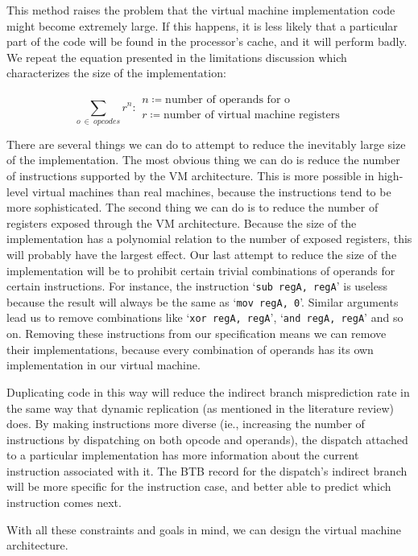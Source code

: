 	This method raises the problem that the virtual machine implementation code might become extremely large. If this happens, it is less likely that a particular part of the code will be found in the processor's cache, and it will perform badly. We repeat the equation presented in the limitations discussion which characterizes the size of the implementation:
	
	\[
	\sum_{o~\in~opcodes} r^n : 
	\begin{array}{l}
	n \coloneqq \text{number of operands for o} \\
	r \coloneqq \text{number of virtual machine registers}
	\end{array}
	\] 
	
	There are several things we can do to attempt to reduce the inevitably large size of the implementation. The most obvious thing we can do is reduce the number of instructions supported by the VM architecture. This is more possible in high-level virtual machines than real machines, because the instructions tend to be more sophisticated. The second thing we can do is to reduce the number of registers exposed through the VM architecture. Because the size of the implementation has a polynomial relation to the number of exposed registers, this will probably have the largest effect. Our last attempt to reduce the size of the implementation will be to prohibit certain trivial combinations of operands for certain instructions. For instance, the instruction `\texttt{sub regA, regA}' is useless because the result will always be the same as `\texttt{mov regA, 0}'. Similar arguments lead us to remove combinations like `\texttt{xor regA, regA}', `\texttt{and regA, regA}' and so on. Removing these instructions from our specification means we can remove their implementations, because every combination of operands has its own implementation in our virtual machine.
	
	Duplicating code in this way will reduce the indirect branch misprediction rate in the same way that dynamic replication (as mentioned in the literature review) does. By making instructions more diverse (ie., increasing the number of instructions by dispatching on both opcode and operands), the dispatch attached to a particular implementation has more information about the current instruction associated with it. The BTB record for the dispatch's indirect branch will be more specific for the instruction case, and better able to predict which instruction comes next.
	
	With all these constraints and goals in mind, we can design the virtual machine architecture.
	
